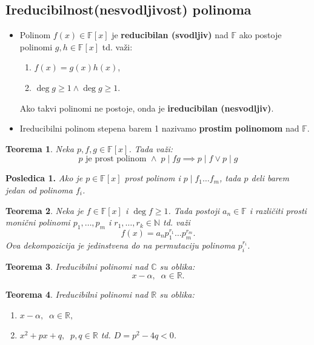 \documentclass[a4paper,12pt,twoside]{report}
\newtheorem{theorem}{Teorema}[section]
\numberwithin{algorithm}{section}
\begin{document}
\subsection{Ireducibilnost(nesvodljivost) polinoma}
\begin{itemize}
    \item Polinom $f(x) \in \mathbb{F}[x]$ je \textbf{reducibilan (svodljiv)} nad $\mathbb{F}$ ako postoje polinomi $g, h \in 
    \mathbb{F}[x]$ td. važi:
    \begin{enumerate}
        \item $f(x) = g(x)h(x)$,
        \item $\deg g \geq 1 \land \deg g \geq 1$.
    \end{enumerate}
    Ako takvi polinomi ne postoje, onda je \textbf{ireducibilan (nesvodljiv)}.
    \item Ireducibilni polinom stepena barem 1 nazivamo \textbf{prostim polinomom} nad $\mathbb{F}$.
\end{itemize}

\begin{theorem}
    Neka $p, f, g \in \mathbb{F}[x]$. Tada važi: 
    \[p \text{ je prost polinom } \land\; p \;|\; fg \implies p \;|\; f \lor p \;|\; g\]
\end{theorem}

\noindent\textbf{Posledica 1.} \textit{Ako je $p \in \mathbb{F}[x]$ prost polinom i $p\;|\; f_1\dots f_m$, tada $p$ deli
barem jedan od polinoma $f_i$.}

\begin{theorem}
    Neka je $f \in \mathbb{F}[x]$ i $\deg f \geq 1$. Tada postoji $a_n \in \mathbb{F}$ i različiti prosti monični polinomi 
    $p_1, \dots, p_m$ i $r_1, \dots, r_k \in \mathbb{N}$ td. važi
    \[ f(x) = a_np_1^{r_1}\dots p_m^{r_m}. \]
    Ova dekompozicija je jedinstvena do na permutaciju polinoma $p_i^{r_i}$.
\end{theorem}

\begin{theorem}
    Ireducibilni polinomi nad $\mathbb{C}$ su oblika:
    \[ x - \alpha, \;\; \alpha \in \mathbb{R}. \]
\end{theorem}

\begin{theorem}
    Ireducibilni polinomi nad $\mathbb{R}$ su oblika:
    \begin{enumerate}
        \item $ x - \alpha, \;\; \alpha \in \mathbb{R}, $
        \item $x^2 + px + q, \;\; p, q \in \mathbb{R}$ td. $D = p^2 - 4q < 0$.
    \end{enumerate}
\end{theorem}
\end{document}
